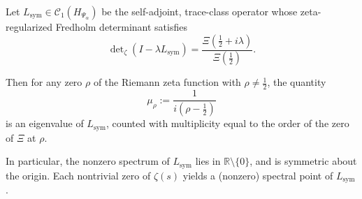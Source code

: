 \begin{lemma}
\label{lem:zero-to-spectrum-correspondence}
Let \( L_{\mathrm{sym}} \in \mathcal{C}_1(H_{\Psi_\alpha}) \) be the self-adjoint, trace-class operator whose zeta-regularized Fredholm determinant satisfies
\[
\det\nolimits_\zeta(I - \lambda L_{\mathrm{sym}}) = \frac{\Xi\left( \tfrac{1}{2} + i\lambda \right)}{\Xi\left( \tfrac{1}{2} \right)}.
\]

Then for any zero \( \rho \) of the Riemann zeta function with \( \rho \ne \tfrac{1}{2} \), the quantity
\[
\mu_\rho := \frac{1}{i(\rho - \tfrac{1}{2})}
\]
is an eigenvalue of \( L_{\mathrm{sym}} \), counted with multiplicity equal to the order of the zero of \( \Xi \) at \( \rho \).

\medskip
\noindent
In particular, the nonzero spectrum of \( L_{\mathrm{sym}} \) lies in \( \mathbb{R} \setminus \{0\} \), and is symmetric about the origin. Each nontrivial zero of \( \zeta(s) \) yields a (nonzero) spectral point of \( L_{\mathrm{sym}} \).
\end{lemma}
% 